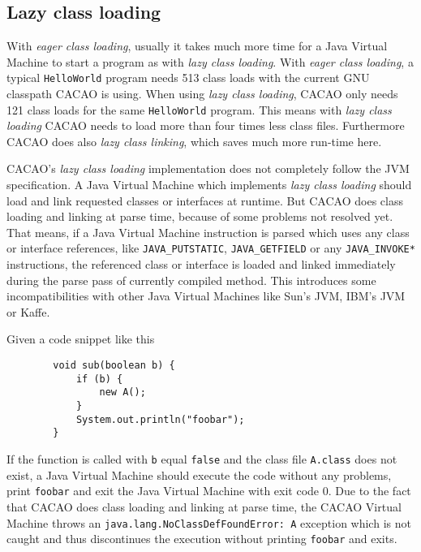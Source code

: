\subsection{Lazy class loading}
\label{sectionlazyclassloading}

With \textit{eager class loading}, usually it takes much more time for
a Java Virtual Machine to start a program as with \textit{lazy class
loading}. With \textit{eager class loading}, a typical
\texttt{HelloWorld} program needs 513 class loads with the current GNU
classpath CACAO is using. When using \textit{lazy class loading},
CACAO only needs 121 class loads for the same \texttt{HelloWorld}
program. This means with \textit{lazy class loading} CACAO needs to
load more than four times less class files. Furthermore CACAO does
also \textit{lazy class linking}, which saves much more run-time here.

CACAO's \textit{lazy class loading} implementation does not completely
follow the JVM specification. A Java Virtual Machine which implements
\textit{lazy class loading} should load and link requested classes or
interfaces at runtime. But CACAO does class loading and linking at
parse time, because of some problems not resolved yet. That means, if
a Java Virtual Machine instruction is parsed which uses any class or
interface references, like \texttt{JAVA\_PUTSTATIC},
\texttt{JAVA\_GETFIELD} or any \texttt{JAVA\_INVOKE*} instructions,
the referenced class or interface is loaded and linked immediately
during the parse pass of currently compiled method. This introduces
some incompatibilities with other Java Virtual Machines like Sun's
JVM, IBM's JVM or Kaffe.

Given a code snippet like this

\begin{verbatim}
        void sub(boolean b) {
            if (b) {
                new A();
            }
            System.out.println("foobar");
        }
\end{verbatim}

If the function is called with \texttt{b} equal \texttt{false} and the
class file \texttt{A.class} does not exist, a Java Virtual Machine
should execute the code without any problems, print \texttt{foobar}
and exit the Java Virtual Machine with exit code 0. Due to the fact
that CACAO does class loading and linking at parse time, the CACAO
Virtual Machine throws an \texttt{java.lang.NoClassDefFoundError:~A}
exception which is not caught and thus discontinues the execution
without printing \texttt{foobar} and exits.


